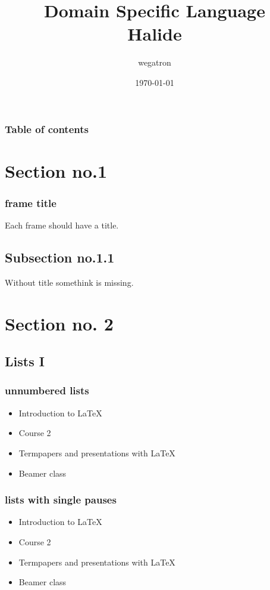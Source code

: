 \documentclass[hyperref]{beamer}
\title{Domain Specific Language \\ Halide}
\author{wegatron}
\date{\today}
\begin{document}
\begin{frame}
\titlepage
\end{frame} 

\begin{frame}
\frametitle{Table of contents}
\tableofcontents
\end{frame} 

\section{Section no.1} 
\begin{frame}
\frametitle{frame title} 
Each frame should have a title.
\end{frame}
\subsection{Subsection no.1.1  }
\begin{frame}
Without title somethink is missing. 
\end{frame}

\section{Section no. 2} 
\subsection{Lists I}
\begin{frame}
\frametitle{unnumbered lists}
\begin{itemize}
\item Introduction to  \LaTeX{}  
\item Course 2 
\item Termpapers and presentations with \LaTeX{}  
\item Beamer class
\end{itemize} 
\end{frame}

\begin{frame}\frametitle{lists with single pauses}
\begin{itemize}
\item Introduction to  \LaTeX{}  \pause 
\item Course 2 \pause 
\item Termpapers and presentations with \LaTeX{}  \pause 
\item Beamer class
\end{itemize} 
\end{frame}
\end{document}
